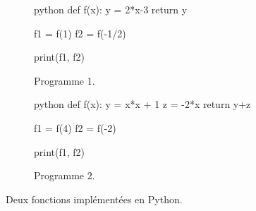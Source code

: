 
\begin{figure}[!htb]
	\begin{subfigure}[b]{.45\textwidth}
\begin{mintedbox}{python}
def f(x):
y = 2*x-3
return y

f1 = f(1)
f2 = f(-1/2)


print(f1, f2)
\end{mintedbox}
	\caption{Programme 1.}
	\label{python:1}
	\end{subfigure}
	\begin{subfigure}[b]{.45\textwidth}
\begin{mintedbox}{python}
def f(x):
y = x*x + 1
z = -2*x
return y+z

f1 = f(4)
f2 = f(-2)

print(f1, f2)
\end{mintedbox}
	\caption{Programme 2.}
	\label{python:2}
	\end{subfigure}
	\caption{Deux fonctions implémentées en Python.}
	\label{python:1-2}
\end{figure}